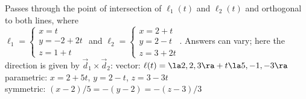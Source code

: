 {Passes through the point of intersection of $\ell_1(t)$ and $\ell_2(t)$ and orthogonal to both lines, where\\
$\ell_1 = \begin{cases}x=t\\y=-2+2t\\z=1+t\end{cases}$ \quad and \quad 
$\ell_2 = \begin{cases}x=2+t\\y=2-t\\z=3+2t\end{cases}$.
}
{Answers can vary; here the direction is given by $\vec d_1\times \vec d_2$:
vector: $\ell(t) = \la 2,2,3\ra + t\la 5,-1,-3\ra$\\
parametric: $x= 2+5t$, $y=2-t$, $z = 3-3t$\\
symmetric: $(x-2)/5=-(y-2)=-(z-3)/3$
}

